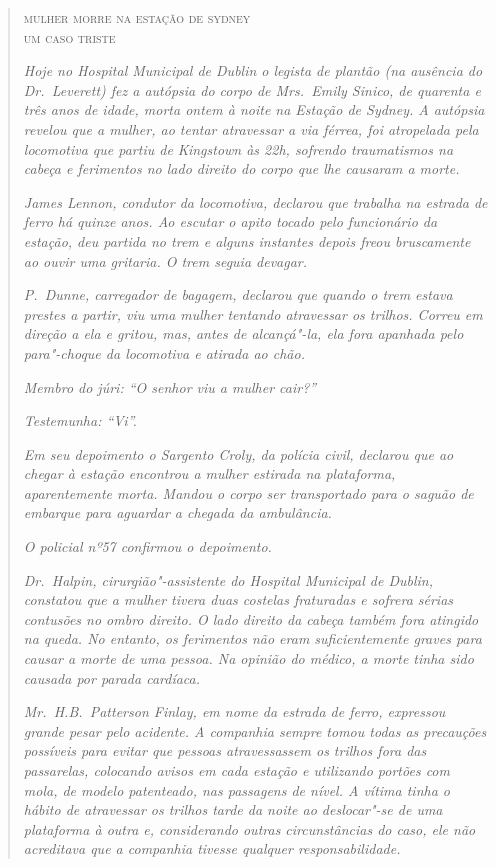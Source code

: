 \begin{quote}
{\centering \textsc{mulher morre na estação de sydney}\\
\textsc{um caso triste}\par}

\medskip

\textit{Hoje no Hospital Municipal de Dublin o legista de plantão (na
ausência do Dr.~Leverett) fez a autópsia do corpo de Mrs.~Emily
Sinico, de quarenta e três anos de idade, morta ontem à noite
na Estação de Sydney.  A autópsia revelou que a mulher, ao tentar
atravessar a via férrea, foi atropelada pela locomotiva que
partiu de Kingstown às 22h, sofrendo traumatismos na
cabeça e ferimentos no lado direito do corpo que lhe causaram a morte.}

\textit{James Lennon, condutor da locomotiva, declarou que trabalha na
estrada de ferro há quinze anos.  Ao escutar o apito tocado pelo
funcionário da estação, deu partida no trem e alguns
instantes depois freou bruscamente ao ouvir uma gritaria.  O
trem seguia devagar.}

\textit{P.~Dunne, carregador de bagagem, declarou que quando o trem
estava prestes a partir, viu uma mulher tentando atravessar os
trilhos.  Correu em direção a ela e gritou, mas, antes de alcançá"-la,
ela fora apanhada pelo para"-choque da locomotiva e atirada ao chão.}

\textit{Membro do júri: “O senhor viu a mulher cair?”}

\textit{Testemunha: “Vi”.}

\textit{Em seu depoimento o Sargento Croly, da polícia civil, declarou que ao
chegar à estação encontrou a mulher estirada na plataforma,
aparentemente morta.  Mandou o corpo ser transportado para o saguão
de embarque para aguardar a chegada da ambulância.}

\textit{O policial nº57 confirmou o depoimento.}

\textit{Dr.~Halpin, cirurgião"-assistente do Hospital Municipal de Dublin,
constatou que a mulher tivera duas costelas fraturadas e sofrera
sérias contusões no ombro direito.  O lado direito da cabeça
também fora atingido na queda.  No entanto, os ferimentos não eram
suficientemente graves para causar a morte de uma pessoa.  Na
opinião do médico, a morte tinha sido causada por parada cardíaca.}

\textit{Mr.~H.B.~Patterson Finlay, em nome da estrada de ferro,
expressou grande pesar pelo acidente.  A companhia sempre tomou todas
as precauções possíveis para evitar que pessoas atravessassem os
trilhos fora das passarelas, colocando avisos em cada estação e
utilizando portões com mola, de modelo patenteado, nas
passagens de nível.  A vítima tinha o hábito de atravessar os
trilhos tarde da noite ao deslocar"-se de uma plataforma à outra e,
considerando outras circunstâncias do caso, ele não acreditava
que a companhia tivesse qualquer responsabilidade.}


\end{quote}
